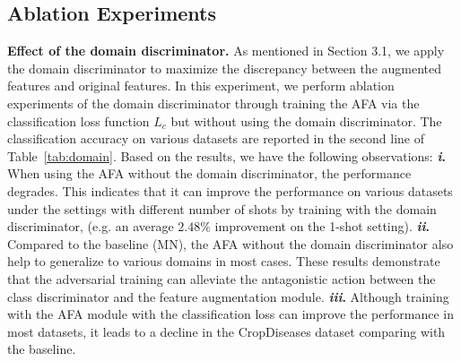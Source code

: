 \documentclass[runningheads]{utils/llncs}
\begin{document}
\subsection{Ablation Experiments}
\textbf{Effect of the domain discriminator.} 
As mentioned in Section 3.1, we apply the domain discriminator to maximize the discrepancy between the augmented features and original features. 
In this experiment, we perform ablation experiments of the domain discriminator through training the AFA via the classification loss function $L_c$ but without using the domain discriminator. 
The classification accuracy on various datasets are reported in the second line of Table~\ref{tab:domain}. 
Based on the results, we have the following observations:
\textbf{\emph{i}.}
When using the AFA without the domain discriminator, the performance degrades. 
This indicates that it can improve the performance on various datasets under the settings with different number of shots by training with the domain discriminator,  (e.g. an average $2.48\%$ improvement on the 1-shot setting).
\textbf{\emph{ii}.}
Compared to the baseline (MN), the AFA without the domain discriminator also help to generalize to various domains in most cases. 
These results demonstrate that the adversarial training can alleviate the antagonistic action between the class discriminator and the feature augmentation module.
\textbf{\emph{iii}.}
Although training with the AFA module with the classification loss can improve the performance in most datasets, it leads to a decline in the CropDiseases dataset comparing with the baseline.
\end{document}

